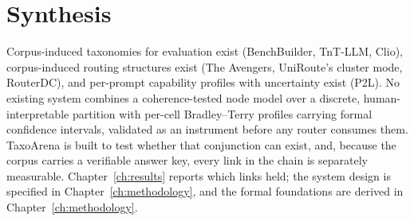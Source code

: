 \section*{Synthesis}

Corpus-induced taxonomies for evaluation exist (BenchBuilder,
TnT-LLM, Clio), corpus-induced routing structures exist (The
Avengers, UniRoute's cluster mode, RouterDC), and per-prompt
capability profiles with uncertainty exist (P2L). No existing system
combines a coherence-tested node model over a discrete,
human-interpretable partition with per-cell Bradley--Terry profiles
carrying formal confidence intervals, validated as an instrument
before any router consumes them. TaxoArena is built to test whether
that conjunction can exist, and, because the corpus carries a
verifiable answer key, every link in the chain is separately
measurable. Chapter~\ref{ch:results} reports which links held; the
system design is specified in Chapter~\ref{ch:methodology},
and the formal foundations are derived in
Chapter~\ref{ch:methodology}.

